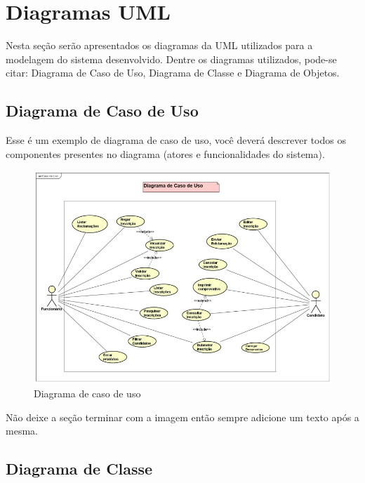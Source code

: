 \documentclass[
  a4paper,%
  12pt,%
  english,%
  brazilian,%
]{article}
\begin{document}
\section*{Diagramas UML}
    Nesta seção serão apresentados os diagramas da UML utilizados para a modelagem do sistema desenvolvido. Dentre os diagramas utilizados, pode-se citar: Diagrama de Caso de Uso, Diagrama de Classe e Diagrama de Objetos.
    
    \subsection*{Diagrama de Caso de Uso}

    Esse é um exemplo de diagrama de caso de uso, você deverá descrever todos os componentes presentes no diagrama (atores e funcionalidades do sistema).

            \begin{figure}[h]
\centering
\caption{Diagrama de caso de uso}%
\label{fig:diagrama-caso-uso}
 \includegraphics[width=1.1\textwidth]{Logos/caso_de_uso_1.jpg}
\end{figure}

    Não deixe a seção terminar com a imagem então sempre adicione um texto após a mesma.
    
    \subsection*{Diagrama de Classe}
\end{document}
